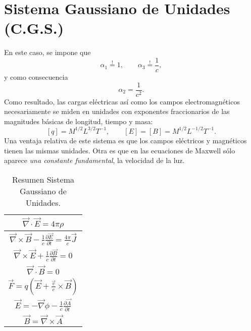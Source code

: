 \section{Sistema Gaussiano de Unidades (C.G.S.)}\label{appunid}
En este caso, se impone que
\begin{equation}
 \alpha_1\stackrel{!}{=} 1, \qquad \alpha_3\stackrel{!}{=} \frac{1}{c},
\end{equation}
y como consecuencia
\begin{equation}
\alpha_2=\frac{1}{c^2}.
\end{equation} 
Como resultado, las cargas eléctricas así como los campos electromagnéticos necesariamente se miden en unidades con exponentes fraccionarios de las magnitudes básicas de longitud, tiempo y masa:
\begin{equation}
 \left[q\right]=M^{1/2}L^{3/2}T^{-1}, \qquad
\left[E\right]=\left[B\right]=M^{1/2}L^{-1/2}T^{-1}.
\end{equation} 
Una ventaja relativa de este sistema es que los campos eléctricos y magnéticos tienen las mismas unidades. Otra es que en las ecuaciones de Maxwell sólo aparece \textit{una constante fundamental}, la velocidad de la luz.
\begin{table}
\begin{center}
\begin{tabular}{|c|}\hline
$\vec{\nabla}\cdot\vec{E}=4\pi\rho$ \\\hline
$\vec{\nabla}\times \vec{B}-\frac{1}{c}\frac{\partial\vec{E}}{\partial t}=
\frac{4\pi}{c}\vec{J}$ \\\hline
$\vec{\nabla}\times \vec{E}+\frac{1}{c}\frac{\partial\vec{B}}{\partial t}=0$
\\\hline
$\vec{\nabla}\cdot\vec{B}=0$\\\hline
$\vec{F}=q\left(\vec{E}+\frac{\vec{v}}{c}\times \vec{B}\right)$\\\hline
$\vec{E}=-\vec{\nabla}\phi-\frac{1}{c}\frac{\partial \vec{A}}{\partial
t}$\\\hline
$\vec{B}=\vec{\nabla}\times \vec{A}$\\\hline
\end{tabular}
\label{TUSG}
\caption{Resumen Sistema Gaussiano de Unidades.}
\end{center}
\end{table}

